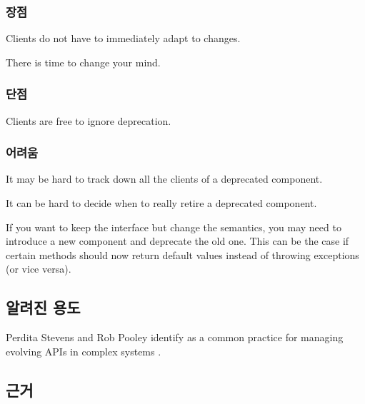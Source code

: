 \documentclass[a4paper,10pt,twoside]{book}
\begin{document}
\subsubsection*{장점}

\begin{bulletlist}
\item Clients do not have to immediately adapt to changes.

\item There is time to change your mind.
\end{bulletlist}

\subsubsection*{단점}

\begin{bulletlist}
\item Clients are free to ignore deprecation.
\end{bulletlist}

\subsubsection*{어려움}

\begin{bulletlist}
\item It may be hard to track down all the clients of a deprecated component.

\item It can be hard to decide when to really retire a deprecated component.

\item If you want to keep the interface but change the semantics, you may need to introduce a new component and deprecate the old one. This can be the case if certain methods should now return default values instead of throwing exceptions (or vice versa).
\end{bulletlist}

\subsection*{알려진 용도}

Perdita Stevens and Rob Pooley identify  as a common practice for managing evolving APIs in complex systems \cite{Stev98a}.

\subsection*{근거}
\end{document}
